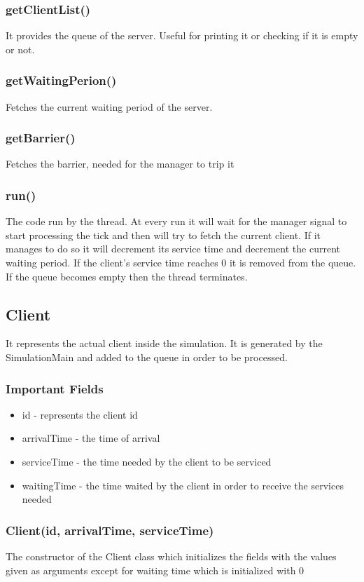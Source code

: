\documentclass[10pt,a4paper]{article}
\begin{document}
\subsubsection{getClientList()}
It provides the queue of the server. Useful for printing it or checking if it is empty or not.
\subsubsection{getWaitingPerion()}
Fetches the current waiting period of the server.
\subsubsection{getBarrier()}
Fetches the barrier, needed for the manager to trip it
\subsubsection{run()}
The code run by the thread. At every run it will wait for the manager signal to start processing the tick and then will try to fetch the current client. If it manages to do so it will decrement its service time and decrement the current waiting period. If the client's service time reaches 0 it is removed from the queue. If the queue becomes empty then the thread terminates.
\subsection{Client}
It represents the actual client inside the simulation. It is generated by the SimulationMain and added to the queue in order to be processed.
\subsubsection{Important Fields}
\begin{itemize}
\item id - represents the client id
\item arrivalTime - the time of arrival
\item serviceTime - the time needed by the client to be serviced
\item waitingTime - the time waited by the client in order to receive the services needed	
\end{itemize}
\subsubsection{Client(id, arrivalTime, serviceTime)}
The constructor of the Client class which initializes the fields with the values given as arguments except for waiting time which is initialized with 0
\end{document}
